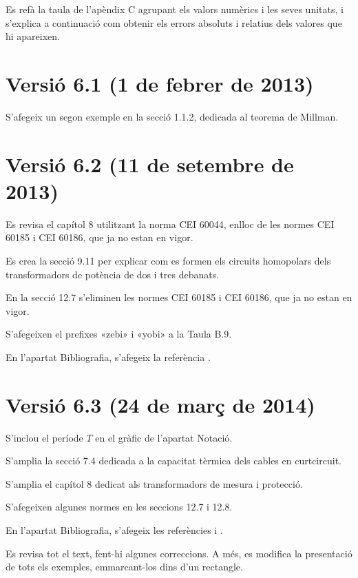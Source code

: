 Es refà la taula de l'apèndix C agrupant els valors numèrics i les seves unitats, i s'explica a continuació com obtenir els errors absoluts i relatius dels valores que hi apareixen.

\section*{Versió 6.1 (1 de febrer de 2013)}

S'afegeix un segon exemple en la secció 1.1.2, dedicada al teorema de Millman.


\section*{Versió 6.2 (11 de setembre de 2013)}

 Es revisa el capítol 8 utilitzant la norma CEI 60044, enlloc de les normes CEI 60185 i CEI 60186, que ja no estan en vigor.

Es crea la secció 9.11 per explicar com es formen els circuits homopolars dels transformadors de potència de dos i tres debanats.

En la secció 12.7 s'eliminen les normes CEI 60185 i CEI 60186, que ja no estan en vigor.

S'afegeixen el prefixes «zebi» i «yobi» a la Taula B.9.

En l'apartat Bibliografia, s'afegeix la referència \cite{RASe}.

\section*{Versió 6.3 (24 de març de 2014)}

S'inclou el període $T$ en el gràfic de l'apartat Notació.

S'amplia la secció 7.4 dedicada a la capacitat tèrmica dels cables en curtcircuit.

S'amplia el capítol 8 dedicat als transformadors de mesura i protecció.

S'afegeixen algunes normes en les seccions 12.7 i 12.8.

En l'apartat Bibliografia, s'afegeix les referències \cite{KAS} i \cite{JCD}.

Es revisa tot el text, fent-hi algunes correccions. A més, es modifica la presentació de tots els exemples, emmarcant-los dins d'un rectangle.


